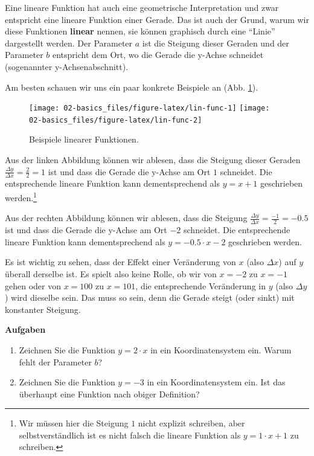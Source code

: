 \documentclass[
]{book}
\providecommand{\tightlist}{%
  \setlength{\itemsep}{0pt}\setlength{\parskip}{0pt}}
\begin{document}
Eine lineare Funktion hat auch eine geometrische Interpretation und zwar entspricht eine lineare Funktion einer Gerade. Das ist auch der Grund, warum wir diese Funktionen \textbf{linear} nennen, sie können graphisch durch eine ``Linie'' dargestellt werden. Der Parameter \(a\) ist die Steigung dieser Geraden und der Parameter \(b\) entspricht dem Ort, wo die Gerade die y-Achse schneidet (sogenannter y-Achsenabschnitt).

Am besten schauen wir uns ein paar konkrete Beispiele an (Abb. \ref{fig:lin-func}).

\begin{figure}

{\centering \texttt{[image: 02-basics\_files/figure-latex/lin-func-1]} \texttt{[image: 02-basics\_files/figure-latex/lin-func-2]} 

}

\caption{Beispiele linearer Funktionen.}\label{fig:lin-func}
\end{figure}

Aus der linken Abbildung können wir ablesen, dass die Steigung dieser Geraden \(\frac{\Delta y}{\Delta x}=\frac{2}{2}=1\) ist und dass die Gerade die y-Achse am Ort \(1\) schneidet. Die entsprechende lineare Funktion kann dementsprechend als \(y = x + 1\) geschrieben werden.\footnote{Wir müssen hier die Steigung \(1\) nicht explizit schreiben, aber selbstverständlich ist es nicht falsch die lineare Funktion als \(y = 1\cdot x + 1\) zu schreiben.}

Aus der rechten Abbildung können wir ablesen, dass die Steigung \(\frac{\Delta y}{\Delta x}=\frac{-1}{2}=-0.5\) ist und dass die Gerade die y-Achse am Ort \(-2\) schneidet. Die entsprechende lineare Funktion kann dementsprechend als \(y = -0.5\cdot x -2\) geschrieben werden.

Es ist wichtig zu sehen, dass der Effekt einer Veränderung von \(x\) (also \(\Delta x\)) auf \(y\) überall derselbe ist. Es spielt also keine Rolle, ob wir von \(x=-2\) zu \(x=-1\) gehen oder von \(x=100\) zu \(x=101\), die entsprechende Veränderung in \(y\) (also \(\Delta y\)) wird dieselbe sein. Das muss so sein, denn die Gerade steigt (oder sinkt) mit konstanter Steigung.

\textbf{Aufgaben}

\begin{enumerate}
\def\labelenumi{\arabic{enumi}.}
\tightlist
\item
  Zeichnen Sie die Funktion \(y = 2\cdot x\) in ein Koordinatensystem ein. Warum fehlt der Parameter \(b\)?
\item
  Zeichnen Sie die Funktion \(y=-3\) in ein Koordinatensystem ein. Ist das überhaupt eine Funktion nach obiger Definition?
\end{enumerate}
\end{document}
